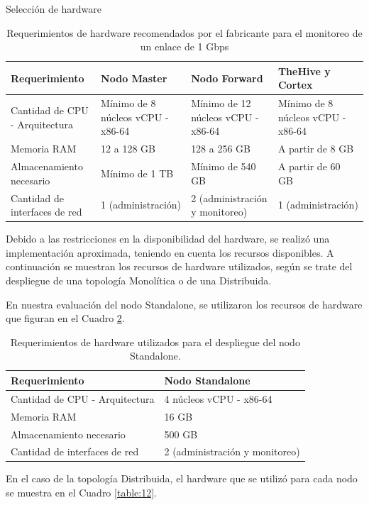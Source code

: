 \begin{subsection}{Selección de hardware}
\begin{table}[H]
\begin{tabular}{|m{9em}|m{9em}|m{9em}|m{9em}|}
            \hline 
                Requerimiento  & Nodo Master &  Nodo Forward & TheHive y Cortex \\ 
            \hline
                Cantidad de CPU - Arquitectura & Mínimo de 8 núcleos vCPU - x86-64 & Mínimo de 12 núcleos vCPU - x86-64 & Mínimo de 8 núcleos vCPU - x86-64 \\ 
            \hline
                Memoria RAM  & 12 a 128 GB & 128 a 256 GB & A partir de 8 GB \\ 
            \hline
                Almacenamiento necesario & Mínimo de 1 TB  & Mínimo de 540 GB & A partir de 60 GB \\
            \hline
            Cantidad de interfaces de red & 1 (administración) & 2 (administración y monitoreo) & 1 (administración) \\
                \hline %
            \end{tabular}
            \caption{Requerimientos de hardware recomendados por el fabricante para el monitoreo de un enlace de 1 Gbps}
            \label{table:5}
        \end{table}
        Debido a las restricciones en la disponibilidad del hardware, se realizó una implementación aproximada, teniendo en cuenta los recursos disponibles. A continuación se muestran los recursos de hardware utilizados, según se trate del despliegue de una topología Monolítica o de una Distribuida. \par
        En nuestra evaluación del nodo Standalone, se utilizaron los recursos de hardware que figuran en el Cuadro \ref{table:16}.
        \begin{table}[H]
            \centering
            \begin{tabular}{|m{10em}|m{10em}|}
            
                \hline 
                    Requerimiento  & Nodo Standalone \\ 
                \hline
                    Cantidad de CPU - Arquitectura &  4 núcleos vCPU - x86-64  \\ 
                \hline
                    Memoria RAM  &  16 GB  \\ 
                \hline
                    Almacenamiento necesario   & 500 GB  \\
                \hline
            Cantidad de interfaces de red  & 2 (administración y monitoreo) \\
                \hline %
            \end{tabular}
            \caption{Requerimientos de hardware utilizados para el despliegue del nodo Standalone.}
            \label{table:16}
        \end{table}
        En el caso de la topología Distribuida, el hardware que se utilizó para cada nodo se muestra en el Cuadro \ref{table:12}.
        \begin{table}[H]
            \centering
            \begin{tabular}{|m{9em}|m{9em}|m{9em}|m{9em}|}
            

\end{tabular}
\end{table}
\end{subsection}
